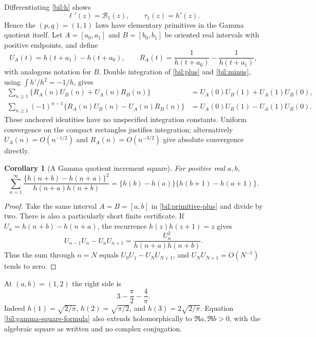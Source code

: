 \documentclass[11pt]{article}
\newtheorem{corollary}[theorem]{Corollary}
\theoremstyle{definition}
\theoremstyle{remark}
\numberwithin{equation}{section}
\begin{document}
Differentiating \eqref{bil:h} shows
\begin{equation}\label{bil:h-derivative}
 \ell'(z)=\mathcal B_1(z),\qquad \tau_1(z)=h'(z).
\end{equation}
Hence the $(p,q)=(1,1)$ laws have elementary primitives in the Gamma
quotient itself. Let $A=[a_0,a_1]$ and $B=[b_0,b_1]$ be oriented
real intervals with positive endpoints, and define
\[
 U_A(t)=h(t+a_1)-h(t+a_0),\qquad
 R_A(t)=\frac1{h(t+a_0)}-\frac1{h(t+a_1)},
\]
with analogous notation for $B$. Double integration of
\eqref{bil:plus} and \eqref{bil:minus}, using
$\int h'/h^2=-1/h$, gives
\begin{align}
 \sum_{n\ge1}\{R_A(n)U_B(n)+U_A(n)R_B(n)\}
 &=U_A(0)U_B(1)+U_A(1)U_B(0),\label{bil:primitive-plus}\\
 \sum_{n\ge1}(-1)^{n-1}\{R_A(n)U_B(n)-U_A(n)R_B(n)\}
 &=U_A(0)U_B(1)-U_A(1)U_B(0).\label{bil:primitive-minus}
\end{align}
These anchored identities have no unspecified integration constants.
Uniform convergence on the compact rectangles justifies integration;
alternatively $U_A(n)=O(n^{-1/2})$ and $R_A(n)=O(n^{-3/2})$
give absolute convergence directly.

\begin{corollary}[A Gamma quotient increment square]\label{bil:gamma-square}
For positive real $a,b$,
\begin{equation}\label{bil:gamma-square-formula}
 \boxed{\sum_{n=1}^{\infty}
   \frac{\{h(n+b)-h(n+a)\}^{2}}{h(n+a)h(n+b)}
   =\{h(b)-h(a)\}\{h(b+1)-h(a+1)\}.}
\end{equation}
\end{corollary}
\begin{proof}
Take the same interval $A=B=[a,b]$ in
\eqref{bil:primitive-plus} and divide by two.
There is also a particularly short finite certificate. If
$U_n=h(n+b)-h(n+a)$, the recurrence $h(z)h(z+1)=z$ gives
\[
 U_{n-1}U_n-U_nU_{n+1}
       =\frac{U_n^2}{h(n+a)h(n+b)}.
\]
Thus the sum through $n=N$ equals $U_0U_1-U_NU_{N+1}$, and
$U_NU_{N+1}=O(N^{-1})$ tends to zero.
\end{proof}
At $(a,b)=(1,2)$ the right side is
\begin{equation}\label{bil:gamma-square-example}
 3-\frac\pi2-\frac4\pi.
\end{equation}
Indeed $h(1)=\sqrt{2/\pi}$, $h(2)=\sqrt{\pi/2}$, and
$h(3)=2\sqrt{2/\pi}$. Equation \eqref{bil:gamma-square-formula}
also extends holomorphically to $\Re a,\Re b>0$, with the algebraic
square as written and no complex conjugation.
\end{document}
